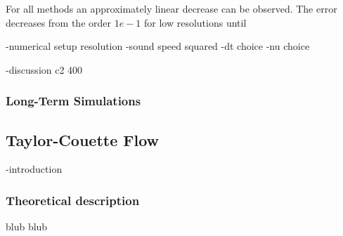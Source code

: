 \newpage


For all methods an approximately linear decrease  can be observed.
The error decreases from the order $1e-1$ for low resolutions until


-numerical setup resolution
-sound speed squared
-dt choice
-nu choice

-discussion c2 400

\subsubsection{Long-Term Simulations}
\newpage


\subsection{Taylor-Couette Flow}

-introduction

\subsubsection{Theoretical description}

blub blub
